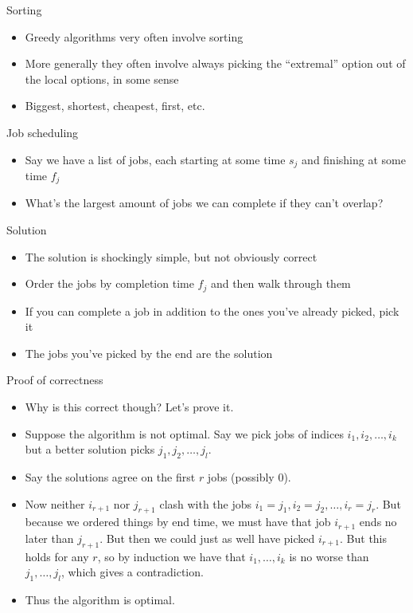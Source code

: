 \documentclass{beamer}
\begin{document}
\begin{frame}[plain]{Sorting}
    \begin{itemize}
        \item Greedy algorithms very often involve sorting
        \item More generally they often involve always picking the ``extremal'' option out of the local options, in some sense
        \item Biggest, shortest, cheapest, first, etc.
    \end{itemize}
\end{frame}

\begin{frame}[plain]{Job scheduling}
    \begin{itemize}
        \item Say we have a list of jobs, each starting at some time $s_j$ and finishing at some time $f_j$
        \item What's the largest amount of jobs we can complete if they can't overlap?
    \end{itemize}
\end{frame}

\begin{frame}[plain]{Solution}
    \begin{itemize}
        \item The solution is shockingly simple, but not obviously correct
        \item Order the jobs by completion time $f_j$ and then walk through them
        \item If you can complete a job in addition to the ones you've already picked, pick it
        \item The jobs you've picked by the end are the solution
    \end{itemize}
\end{frame}

\begin{frame}[plain]{Proof of correctness}
    \begin{itemize}
        \item Why is this correct though? Let's prove it.
        \item Suppose the algorithm is not optimal. Say we pick jobs of indices $i_1, i_2, \dots, i_k$ but a better solution picks $j_1, j_2, \dots, j_l$.
        \item Say the solutions agree on the first $r$ jobs (possibly $0$). 
        \item Now neither $i_{r+1}$ nor $j_{r+1}$ clash with the jobs $i_1 = j_1, i_2 = j_2, \dots, i_r = j_r$. But because we ordered things by end time, we must have that job $i_{r+1}$ ends no later than $j_{r+1}$. But then we could just as well have picked $i_{r+1}$. But this holds for any $r$, so by induction we have that $i_1, \dots, i_k$ is no worse than $j_1, \dots, j_l$, which gives a contradiction.
        \item Thus the algorithm is optimal.
    \end{itemize}
\end{frame}
\end{document}
